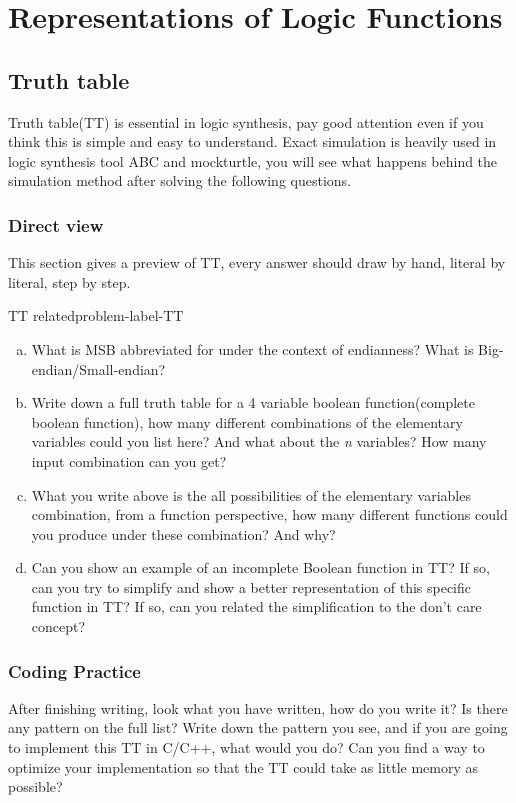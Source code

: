 \documentclass[main.tex]{subfiles}
\begin{document}
\section{Representations of Logic Functions}
\subsection{Truth table}
Truth table(TT) is essential in logic synthesis, pay good attention even if you think this is simple and easy to understand. Exact simulation is heavily used in logic synthesis tool ABC and mockturtle, you will see what happens behind the simulation method after solving the following questions.

\subsubsection{Direct view}
This section gives a preview of TT, every answer should draw by hand, literal by literal, step by step.
\begin{problem}{TT related}{problem-label-TT}
\begin{enumerate}[(a)]
    \item What is MSB abbreviated for under the context of endianness? What is Big-endian/Small-endian?
    \item Write down a full truth table for a 4 variable boolean function(complete boolean function), how many different combinations of the elementary variables could you list here? And what about the \emph{n} variables? How many input combination can you get?
    
    \item What you write above is the all possibilities of the elementary variables combination, from a function perspective, how many different functions could you produce under these combination? And why?

    \item Can you show an example of an incomplete Boolean function in TT? If so, can you try to simplify and show a better representation of this specific function in TT? If so, can you related the simplification to the don't care concept?
\end{enumerate}
\end{problem}
\vspace*{4\baselineskip}
\subsubsection{Coding Practice}
After finishing writing, look what you have written, how do you write it? Is there any pattern on the full list? Write down the pattern you see, and if you are going to implement this TT in C/C++, what would you do? Can you find a way to optimize your implementation so that the TT could take as little memory as possible?
\end{document}

